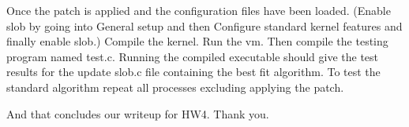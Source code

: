 \documentclass[onecolumn, draftclsnofoot,10pt, compsoc]{IEEEtran}
\begin{document}
\begin{enumerate}
    \begin{singlespace}
    Once the patch is applied and the configuration files have been loaded. (Enable slob by going into General setup and then Configure standard kernel features and finally enable slob.)
    \quad Compile the kernel. Run the vm. Then compile the testing program named test.c. Running the compiled executable should give the test results for the update slob.c file containing the best fit algorithm. To test the standard algorithm repeat all processes excluding applying the patch.
    \end{singlespace}

    And that concludes our writeup for HW4. Thank you. 
\end{enumerate}

%  
%
\end{document}
